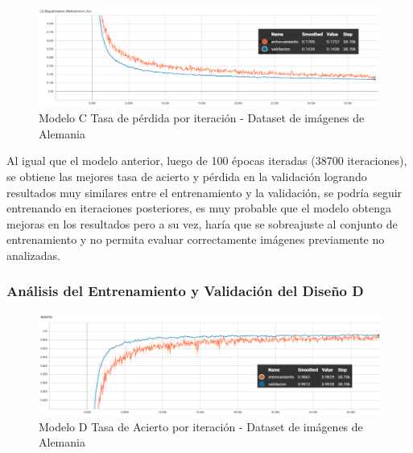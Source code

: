 			
			\begin{figure}[H]
				\begin{center}
				\includegraphics[width=1\textwidth]{images/desarrollo/trainResults/german/model4Loss_1} 
				\end{center}
				\begin{center}
				\caption{\small{Modelo C Tasa de pérdida por iteración - Dataset de imágenes de Alemania}}
				
				{\small{\fontsize{10}{16.8}\selectfont {Fuente: Elaboración propia}}}
				\end{center}
				\vspace{-1.5em}
			\end{figure}

			Al igual que el modelo anterior, luego de 100 épocas iteradas (38700 iteraciones), se obtiene las mejores tasa de acierto y pérdida en la validación logrando resultados muy similares entre el entrenamiento y la validación, se podría seguir entrenando en iteraciones posteriores, es muy probable que el modelo obtenga mejoras en los resultados pero a su vez, haría que se sobreajuste al conjunto de entrenamiento y no permita evaluar correctamente imágenes previamente no analizadas.


		\subsubsection{Análisis del Entrenamiento y Validación del Diseño D} 
			\begin{figure}[H]
				\begin{center}
				\includegraphics[width=1\textwidth]{images/desarrollo/trainResults/german/model6Acierto} 
				\end{center}
				\begin{center}
				\caption{\small{Modelo D Tasa de Acierto por iteración - Dataset de imágenes de Alemania  }}
				
				{\small{\fontsize{10}{16.8}\selectfont {Fuente: Elaboración propia}}}
				\end{center}
				\vspace{-1.5em}
			\end{figure}
			
